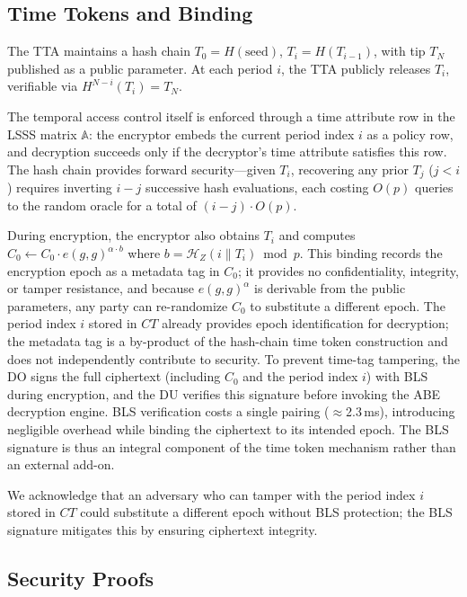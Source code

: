 ﻿\documentclass[lettersize,journal]{IEEEtran}
\begin{document}
\subsection{Time Tokens and Binding}
\label{subsec:time_tokens}

The TTA maintains a hash chain $T_0 = H(\text{seed})$, $T_i =
H(T_{i-1})$, with tip $T_N$ published as a public parameter. At each
period $i$, the TTA publicly releases $T_i$, verifiable via
$H^{N-i}(T_i) = T_N$.

The temporal access control itself is enforced through a time attribute
row in the LSSS matrix $\mathbb{A}$: the encryptor embeds the current
period index $i$ as a policy row, and decryption succeeds only if the
decryptor's time attribute satisfies this row. The hash chain provides
forward security---given $T_i$, recovering any prior $T_j$ ($j < i$)
requires inverting $i{-}j$ successive hash evaluations, each costing
$O(p)$ queries to the random oracle for a total of $(i{-}j)\cdot O(p)$.

During encryption, the encryptor also obtains $T_i$ and computes
$C_0 \leftarrow C_0 \cdot e(g,g)^{\alpha \cdot b}$ where
$b = \mathcal{H}_Z(i \| T_i) \bmod p$.  This binding records the
encryption epoch as a metadata tag in $C_0$; it provides no
confidentiality, integrity, or tamper resistance, and because
$e(g,g)^{\alpha}$ is derivable from the public parameters, any party
can re-randomize $C_0$ to substitute a different epoch.  The period
index $i$ stored in $CT$ already provides epoch identification for
decryption; the metadata tag is a by-product of the hash-chain time
token construction and does not independently contribute to security.
To prevent time-tag tampering, the DO signs the full ciphertext
(including $C_0$ and the period index $i$) with BLS during encryption,
and the DU verifies this signature before invoking the ABE decryption
engine. BLS verification costs a single pairing ($\approx$2.3\,ms),
introducing negligible overhead while binding the ciphertext to its
intended epoch. The BLS signature is thus an integral component of the
time token mechanism rather than an external add-on.

We acknowledge that an adversary who can tamper with the period index $i$
stored in $CT$ could substitute a different epoch without BLS protection;
the BLS signature mitigates this by ensuring ciphertext integrity.

\subsection{Security Proofs}
\label{subsec:security_proofs}
\end{document}
